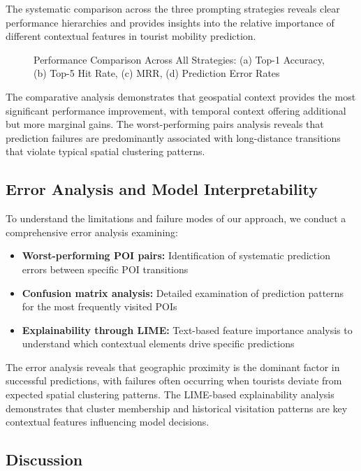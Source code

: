 \documentclass[12pt,a4paper]{article}
\begin{document}
The systematic comparison across the three prompting strategies reveals clear performance hierarchies and provides insights into the relative importance of different contextual features in tourist mobility prediction.

\begin{figure}[h]
\centering
\caption{Performance Comparison Across All Strategies: (a) Top-1 Accuracy, (b) Top-5 Hit Rate, (c) MRR, (d) Prediction Error Rates}
\label{fig:strategy_comparison_detailed}
\end{figure}

The comparative analysis demonstrates that geospatial context provides the most significant performance improvement, with temporal context offering additional but more marginal gains. The worst-performing pairs analysis reveals that prediction failures are predominantly associated with long-distance transitions that violate typical spatial clustering patterns.

\subsection{Error Analysis and Model Interpretability}

To understand the limitations and failure modes of our approach, we conduct a comprehensive error analysis examining:

\begin{itemize}
\item \textbf{Worst-performing POI pairs:} Identification of systematic prediction errors between specific POI transitions
\item \textbf{Confusion matrix analysis:} Detailed examination of prediction patterns for the most frequently visited POIs
\item \textbf{Explainability through LIME:} Text-based feature importance analysis to understand which contextual elements drive specific predictions
\end{itemize}

The error analysis reveals that geographic proximity is the dominant factor in successful predictions, with failures often occurring when tourists deviate from expected spatial clustering patterns. The LIME-based explainability analysis demonstrates that cluster membership and historical visitation patterns are key contextual features influencing model decisions.

\subsection{Discussion}
\end{document}
